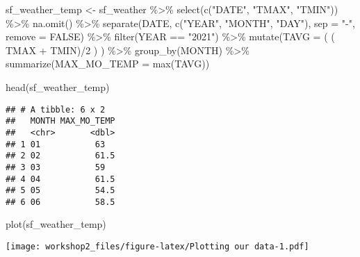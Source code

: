 \documentclass[
]{article}
\newenvironment{Shaded}{\begin{snugshade}}{\end{snugshade}}
\newcommand{\AttributeTok}[1]{\textcolor[rgb]{0.77,0.63,0.00}{#1}}
\newcommand{\ConstantTok}[1]{\textcolor[rgb]{0.00,0.00,0.00}{#1}}
\newcommand{\DecValTok}[1]{\textcolor[rgb]{0.00,0.00,0.81}{#1}}
\newcommand{\FunctionTok}[1]{\textcolor[rgb]{0.00,0.00,0.00}{#1}}
\newcommand{\NormalTok}[1]{#1}
\newcommand{\OtherTok}[1]{\textcolor[rgb]{0.56,0.35,0.01}{#1}}
\newcommand{\SpecialCharTok}[1]{\textcolor[rgb]{0.00,0.00,0.00}{#1}}
\newcommand{\StringTok}[1]{\textcolor[rgb]{0.31,0.60,0.02}{#1}}
\begin{document}
\begin{Shaded}
\begin{Highlighting}[]
\NormalTok{sf\_weather\_temp }\OtherTok{\textless{}{-}}\NormalTok{ sf\_weather }\SpecialCharTok{\%\textgreater{}\%}
  \FunctionTok{select}\NormalTok{(}\FunctionTok{c}\NormalTok{(}\StringTok{"DATE"}\NormalTok{, }\StringTok{"TMAX"}\NormalTok{, }\StringTok{"TMIN"}\NormalTok{)) }\SpecialCharTok{\%\textgreater{}\%}
  \FunctionTok{na.omit}\NormalTok{() }\SpecialCharTok{\%\textgreater{}\%}
  \FunctionTok{separate}\NormalTok{(DATE, }\FunctionTok{c}\NormalTok{(}\StringTok{"YEAR"}\NormalTok{, }\StringTok{"MONTH"}\NormalTok{, }\StringTok{"DAY"}\NormalTok{), }\AttributeTok{sep =} \StringTok{"{-}"}\NormalTok{, }\AttributeTok{remove =} \ConstantTok{FALSE}\NormalTok{) }\SpecialCharTok{\%\textgreater{}\%}
  \FunctionTok{filter}\NormalTok{(YEAR }\SpecialCharTok{==} \StringTok{"2021"}\NormalTok{) }\SpecialCharTok{\%\textgreater{}\%}
  \FunctionTok{mutate}\NormalTok{(}\AttributeTok{TAVG =}\NormalTok{ ( ( TMAX }\SpecialCharTok{+}\NormalTok{ TMIN)}\SpecialCharTok{/}\DecValTok{2}\NormalTok{ ) ) }\SpecialCharTok{\%\textgreater{}\%}
  \FunctionTok{group\_by}\NormalTok{(MONTH) }\SpecialCharTok{\%\textgreater{}\%}
  \FunctionTok{summarize}\NormalTok{(}\AttributeTok{MAX\_MO\_TEMP =} \FunctionTok{max}\NormalTok{(TAVG))}
  
\FunctionTok{head}\NormalTok{(sf\_weather\_temp)}
\end{Highlighting}
\end{Shaded}

\begin{verbatim}
## # A tibble: 6 x 2
##   MONTH MAX_MO_TEMP
##   <chr>       <dbl>
## 1 01           63  
## 2 02           61.5
## 3 03           59  
## 4 04           61.5
## 5 05           54.5
## 6 06           58.5
\end{verbatim}

\begin{Shaded}
\begin{Highlighting}[]
\FunctionTok{plot}\NormalTok{(sf\_weather\_temp)}
\end{Highlighting}
\end{Shaded}

\texttt{[image: workshop2\_files/figure-latex/Plotting our data-1.pdf]}
\end{document}
